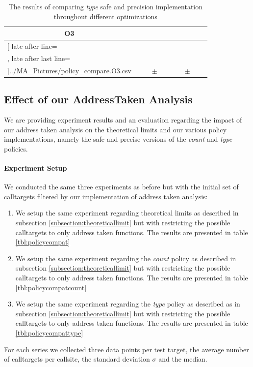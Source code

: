 \begin{table}[!htbp]
{\begin{tabular}{l|c|rcl|c|rcl|c}
\multicolumn{1}{c}{\bfseries O3}
	\\\midrule
	\csvreader[ late after line=\\, late after last line=\\\bottomrule]{../MA_Pictures/policy_compare.O3.csv}{
}
	{\csvcolii  &  \csvcoliii & \csvcolxiii & $\pm$ & \csvcolxiv & \csvcolxv & \csvcolxvi & $\pm$ & \csvcolxvii& \csvcolxviii}%

    	\end{tabular}
}
		\caption {The results of comparing \textit{type} safe and precision implementation throughout different optimizations}
		\label{tbl:policycomptype}
\end{table}

\newpage


\subsection{Effect of our AddressTaken Analysis}
\label{subsection:effectivenessaddresstaken}
We are providing experiment results and an evaluation regarding the impact of our address taken analysis on the theoretical limits and our various policy implementations, namely the safe and precise versions of the \textit{count} and \textit{type} policies.
\paragraph{Experiment Setup} We conducted the same three experiments as before but with the initial set of calltargets filtered by our implementation of address taken analysis:
\begin{enumerate}
\item We setup the same experiment regarding theoretical limits as described in subsection \ref{subsection:theoreticallimit} but with restricting the possible calltargets to only address taken functions. The results are presented in table \ref{tbl:policycompat}
\item We setup the same experiment regarding the \textit{count} policy as described in subsection \ref{subsection:theoreticallimit} but with restricting the possible calltargets to only address taken functions. The results are presented in table \ref{tbl:policycompatcount}
\item We setup the same experiment regarding the \textit{type} policy as described as in subsection \ref{subsection:theoreticallimit} but with restricting the possible calltargets to only address taken functions. The results are presented in table \ref{tbl:policycompattype}
\end{enumerate}
For each series we collected three data points per test target, the average number of calltargets per callsite, the standard deviation $\sigma$ and the median.

